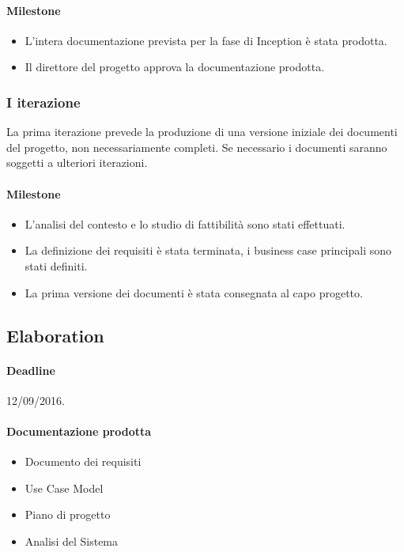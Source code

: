 \paragraph{Milestone}
\begin{itemize}
	\item L'intera documentazione prevista per la fase di Inception \`e stata prodotta.
	\item Il direttore del progetto approva la documentazione prodotta.
\end{itemize}

\subsubsection{I iterazione}

La prima iterazione prevede la produzione di una versione iniziale dei documenti del progetto, non necessariamente completi.
Se necessario i documenti saranno soggetti a ulteriori iterazioni.

\paragraph{Milestone}
\begin{itemize}
	\item L'analisi del contesto e lo studio di fattibilit\`a sono stati effettuati.
	\item La definizione dei requisiti \`e stata terminata, i business case principali sono stati definiti.
	\item La prima versione dei documenti \`e stata consegnata al capo progetto.
\end{itemize}

\subsection{Elaboration}

\paragraph{Deadline}
12/09/2016.

\paragraph{Documentazione prodotta}
\begin{itemize}
	\item Documento dei requisiti
	\item Use Case Model
	\item Piano di progetto
	\item Analisi del Sistema
\end{itemize}


